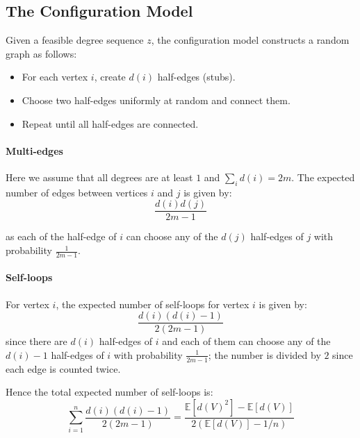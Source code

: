 \documentclass{article}
\begin{document}



\subsection{The Configuration Model}  
Given a feasible degree sequence $z$, the configuration model constructs a random graph as follows: 
\begin{itemize}
    \item For each vertex $i$, create $d(i)$ half-edges (stubs).
    \item Choose two half-edges uniformly at random and connect them.
    \item Repeat until all half-edges are connected.
\end{itemize}

\paragraph{Multi-edges} Here we assume that all degrees are at least $1$ and $\sum_i d(i) = 2m$. The expected number of edges between vertices $i$ and $j$ is given by:
\begin{equation*}
    \frac{d(i)d(j)}{2m-1}
\end{equation*}

as each of the half-edge of $i$ can choose any of the $d(j)$ half-edges of $j$ with probability $\frac{1}{2m-1}$.  

\paragraph{Self-loops} For vertex $i$, the expected number of self-loops for vertex $i$ is given by:
\begin{equation*}
    \frac{d(i) (d(i)-1)}{2(2m-1)}
\end{equation*}
since there are $d(i)$ half-edges of $i$ and each of them can choose any of the $d(i)-1$ half-edges of $i$ with probability $\frac{1}{2m-1}$; the number is divided by $2$ since each edge is counted twice.  

Hence the total expected number of self-loops is:
\begin{equation*}
    \sum_{i=1}^{n}\frac{d(i)(d(i)-1)}{2(2m-1)}=\frac{\mathbb{E}[d(V)^{2}]-\mathbb{E}[d(V)]}{2(\mathbb{E}[d(V)]-1/n)}
\end{equation*}
\end{document}

